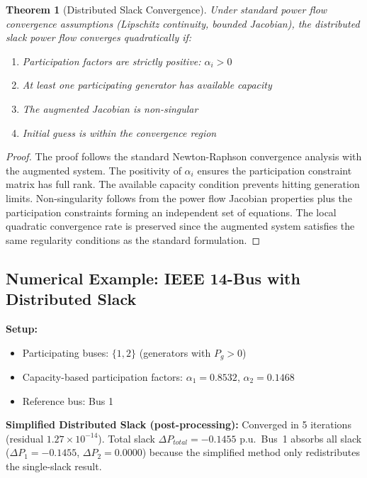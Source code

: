 \documentclass[11pt]{article}
\newtheorem{theorem}{Theorem}
\begin{document}
\begin{theorem}[Distributed Slack Convergence]
Under standard power flow convergence assumptions (Lipschitz continuity, bounded Jacobian), the distributed slack power flow converges quadratically if:
\begin{enumerate}
    \item Participation factors are strictly positive: $\alpha_i > 0$
    \item At least one participating generator has available capacity
    \item The augmented Jacobian is non-singular
    \item Initial guess is within the convergence region
\end{enumerate}
\end{theorem}

\begin{proof}
The proof follows the standard Newton-Raphson convergence analysis with the augmented system. The positivity of $\alpha_i$ ensures the participation constraint matrix has full rank. The available capacity condition prevents hitting generation limits. Non-singularity follows from the power flow Jacobian properties plus the participation constraints forming an independent set of equations. The local quadratic convergence rate is preserved since the augmented system satisfies the same regularity conditions as the standard formulation.
\end{proof}

\subsection{Numerical Example: IEEE 14-Bus with Distributed Slack}

\textbf{Setup:}
\begin{itemize}
    \item Participating buses: $\{1, 2\}$ (generators with $P_g > 0$)
    \item Capacity-based participation factors: $\alpha_1 = 0.8532$, $\alpha_2 = 0.1468$
    \item Reference bus: Bus 1
\end{itemize}

\textbf{Simplified Distributed Slack (post-processing):}
Converged in 5 iterations (residual $1.27 \times 10^{-14}$). Total slack $\Delta P_{total} = -0.1455$ p.u.\ Bus~1 absorbs all slack ($\Delta P_1 = -0.1455$, $\Delta P_2 = 0.0000$) because the simplified method only redistributes the single-slack result.
\end{document}
